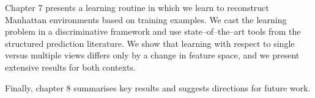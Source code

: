 Chapter 7 presents a learning routine in which we learn to reconstruct
Manhattan environments based on training examples. We cast the
learning problem in a discriminative framework and use
state--of--the--art tools from the structured prediction
literature. We show that learning with respect to single versus
multiple views differs only by a change in feature space, and we
present extensive results for both contexts. 

Finally, chapter 8 summarises key results and suggests directions
for future work.
